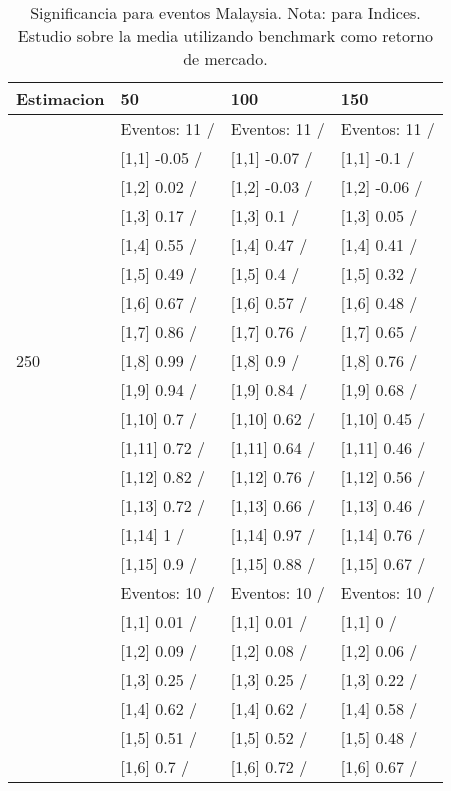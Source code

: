 \begin{table}

\caption{Significancia para eventos Malaysia. Nota: para Indices. Estudio sobre la media utilizando benchmark como retorno de mercado.}
\centering
\begin{tabular}[t]{llll}
\toprule
Estimacion & 50 & 100 & 150\\
\midrule
 & Eventos:  11 / & Eventos:  11 / & Eventos:  11 /\\
 & {}[1,1] -0.05  / & {}[1,1] -0.07  / & {}[1,1] -0.1  /\\
 & {}[1,2] 0.02  / & {}[1,2] -0.03  / & {}[1,2] -0.06  /\\
 & {}[1,3] 0.17  / & {}[1,3] 0.1  / & {}[1,3] 0.05  /\\
 & {}[1,4] 0.55  / & {}[1,4] 0.47  / & {}[1,4] 0.41  /\\
\addlinespace
 & {}[1,5] 0.49  / & {}[1,5] 0.4  / & {}[1,5] 0.32  /\\
 & {}[1,6] 0.67  / & {}[1,6] 0.57  / & {}[1,6] 0.48  /\\
 & {}[1,7] 0.86  / & {}[1,7] 0.76  / & {}[1,7] 0.65  /\\
250 & {}[1,8] 0.99  / & {}[1,8] 0.9  / & {}[1,8] 0.76  /\\
 & {}[1,9] 0.94  / & {}[1,9] 0.84  / & {}[1,9] 0.68  /\\
\addlinespace
 & {}[1,10] 0.7  / & {}[1,10] 0.62  / & {}[1,10] 0.45  /\\
 & {}[1,11] 0.72  / & {}[1,11] 0.64  / & {}[1,11] 0.46  /\\
 & {}[1,12] 0.82  / & {}[1,12] 0.76  / & {}[1,12] 0.56  /\\
 & {}[1,13] 0.72  / & {}[1,13] 0.66  / & {}[1,13] 0.46  /\\
 & {}[1,14] 1  / & {}[1,14] 0.97  / & {}[1,14] 0.76  /\\
\addlinespace
 & {}[1,15] 0.9  / & {}[1,15] 0.88  / & {}[1,15] 0.67  /\\
 & Eventos:  10 / & Eventos:  10 / & Eventos:  10 /\\
 & {}[1,1] 0.01  / & {}[1,1] 0.01  / & {}[1,1] 0  /\\
 & {}[1,2] 0.09  / & {}[1,2] 0.08  / & {}[1,2] 0.06  /\\
 & {}[1,3] 0.25  / & {}[1,3] 0.25  / & {}[1,3] 0.22  /\\
\addlinespace
 & {}[1,4] 0.62  / & {}[1,4] 0.62  / & {}[1,4] 0.58  /\\
 & {}[1,5] 0.51  / & {}[1,5] 0.52  / & {}[1,5] 0.48  /\\
 & {}[1,6] 0.7  / & {}[1,6] 0.72  / & {}[1,6] 0.67  /\\

\end{tabular}
\end{table}
